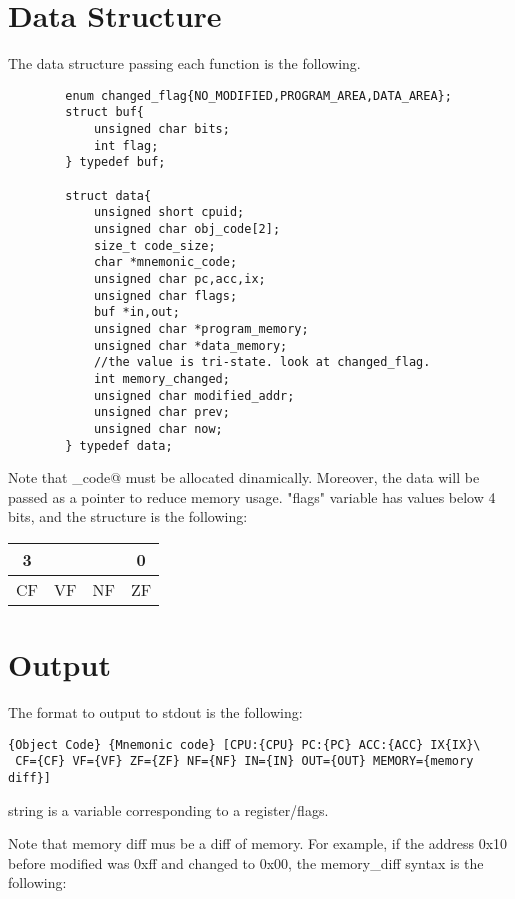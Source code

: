\documentclass[a4paper]{article}
\begin{document}
    \section{Data Structure}
        The data structure passing each function is the following.
        \begin{verbatim}
        enum changed_flag{NO_MODIFIED,PROGRAM_AREA,DATA_AREA};
        struct buf{
            unsigned char bits;
            int flag;
        } typedef buf;
        
        struct data{
            unsigned short cpuid;
            unsigned char obj_code[2];
            size_t code_size;
            char *mnemonic_code;
            unsigned char pc,acc,ix;
            unsigned char flags;
            buf *in,out;
            unsigned char *program_memory;
            unsigned char *data_memory;
            //the value is tri-state. look at changed_flag.
            int memory_changed;
            unsigned char modified_addr;
            unsigned char prev;
            unsigned char now;
        } typedef data;
        \end{verbatim}

        Note that \verb@mnemonic_code@ must be allocated dinamically. Moreover, the data will be passed as a pointer to reduce memory usage. "flags" variable has values below 4 bits, and the structure is the following:
        
        \begin{table}[htb]
            \begin{tabular}{|c|c|c|c|}
            \hline 3&&&0\\
            \hline CF&VF&NF&ZF\\
            \hline
            \end{tabular}
        \end{table}

    \section{Output}
        The format to output to stdout is the following:
        \begin{verbatim}
{Object Code} {Mnemonic code} [CPU:{CPU} PC:{PC} ACC:{ACC} IX{IX}\
 CF={CF} VF={VF} ZF={ZF} NF={NF} IN={IN} OUT={OUT} MEMORY={memory diff}]
        \end{verbatim}

        {string} is a variable corresponding to a register/flags.

        Note that memory diff mus be a diff of memory. For example, if the address 0x10 before modified was 0xff and changed to 0x00, the {memory\_diff} syntax is the following:
\end{document}
